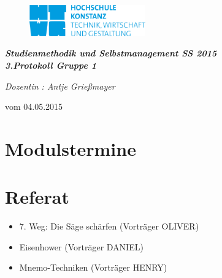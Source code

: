 \documentclass[11pt,a4paper]{article}
\begin{document}
	\begin{figure}
  	\hspace*{-15.0mm} {\includegraphics[width=50mm]{logo}}
  	\end{figure}
  
\hspace{10mm}
\begin{center}

\textit{\textbf{\Huge{ Studienmethodik und Selbstmanagement  SS 2015}}}\\
\emph{\textbf{3.Protokoll Gruppe 1} }
\begin{flushleft}
\textit{ Dozentin :  Antje Grießmayer }
\end{flushleft}

\end{center}
\begin{flushright}
vom 04.05.2015
\end{flushright}
\section*{Modulstermine}

\section*{Referat}

\begin{itemize}
\item 7. Weg: Die Säge schärfen  (Vorträger OLIVER)
\item Eisenhower (Vorträger DANIEL)
\item Mnemo-Techniken (Vorträger HENRY)
\end{itemize}
\end{document}
